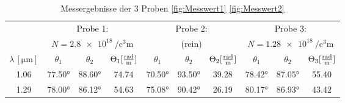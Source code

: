 \begin{table}[H]
	\centering
	\caption{Messergebnisse der 3 Proben \eqref{fig:Messwert1} \eqref{fig:Messwert2}}
	\begin{tabular}{|c|c c c|c c c|c c c|}
		\toprule
		                                    & \multicolumn{3}{|c|}{Probe 1:}                                                     & \multicolumn{3}{|c|}{Probe 2:}                                                      & \multicolumn{3}{|c|}{Probe 3:}                                                                                                                   \\
		                                    & \multicolumn{3}{|c|}{$N=\qty[per-mode=fraction]{2.8e18}{\per\cubic\centi\meter} $}
		                                    & \multicolumn{3}{|c|}{(rein)}                                                       & \multicolumn{3}{|c|}{$N=\qty[per-mode=fraction]{1.28e18}{\per\cubic\centi\meter} $}                                                                                                                                                    \\
		\midrule
		$\lambda \, [\unit{\micro\meter}] $ & $\theta_1$                                                                         & $\theta_2 $                                                                         & $\Theta_1 [\unit[per-mode=fraction]{\radian\per\meter}]$
		                                    & $\theta_1 $                                                                        & $ \theta_2 $                                                                        & $\Theta_2 [\unit[per-mode=fraction]{\radian\per\meter}]$
		                                    & $\theta_1 $                                                                        & $ \theta_2 $                                                                        & $\Theta_3 [\unit[per-mode=fraction]{\radian\per\meter}]$                                                                                         \\
		\midrule
		\num{1.06}                          & \num{77.50}°                                                                       & \num{88.60}°                                                                        & \num{74.74}                                              & \num{70.50}° & \num{93.50}° & \num{39.28} & \num{78.42}° & \num{87.05}° & \num{55.40} \\
		\num{1.29}                          & \num{78.00}°                                                                       & \num{86.12}°                                                                        & \num{54.63}                                              & \num{75.08}° & \num{90.42}° & \num{26.19} & \num{80.17}° & \num{86.93}° & \num{43.42} \\

\end{tabular}
\end{table}
